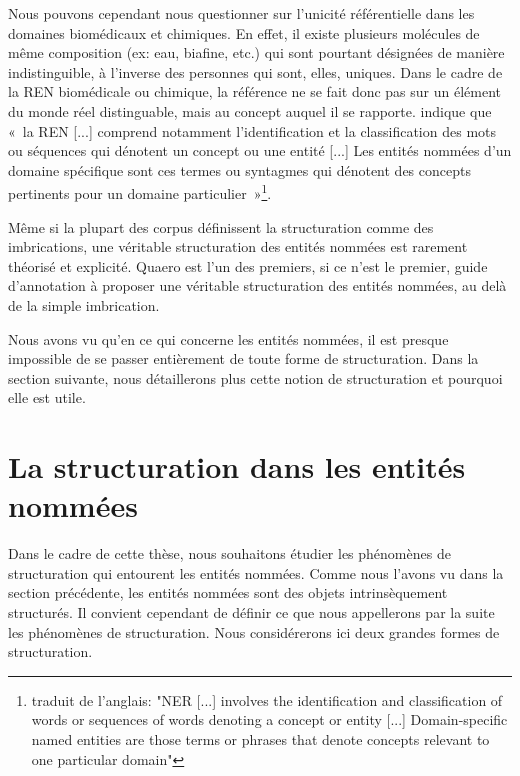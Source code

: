 \documentclass[12pt,a4paper,times,twoside,openright]{report}
\begin{document}
Nous pouvons cependant nous questionner sur l'unicité référentielle dans les domaines biomédicaux et chimiques. En effet, il existe plusieurs molécules de même composition (ex: eau, biafine, etc.) qui sont pourtant désignées de manière indistinguible, à l'inverse des personnes qui sont, elles, uniques. Dans le cadre de la REN biomédicale ou chimique, la référence ne se fait donc pas sur un élément du monde réel distinguable, mais au concept auquel il se rapporte. \citet{al2017biomedical} indique que «\ la REN [...] comprend notamment l'identification et la classification des mots ou séquences qui dénotent un concept ou une entité [...] Les entités nommées d'un domaine spécifique sont ces termes ou syntagmes qui dénotent des concepts pertinents pour un domaine particulier\ »\footnote{traduit de l'anglais: "NER [...] involves the identification and classification of words or sequences of words denoting a concept or entity [...] Domain-specific named entities are those terms or phrases that denote concepts relevant to one particular domain"}.

Même si la plupart des corpus définissent la structuration comme des imbrications, une véritable structuration des entités nommées est rarement théorisé et explicité. Quaero \citep{rosset2011entites} est l'un des premiers, si ce n'est le premier, guide d'annotation à proposer une véritable structuration des entités nommées, au delà de la simple imbrication.

Nous avons vu qu'en ce qui concerne les entités nommées, il est presque impossible de se passer entièrement de toute forme de structuration. Dans la section suivante, nous détaillerons plus cette notion de structuration et pourquoi elle est utile.



    \section{La structuration dans les entités nommées}
    \label{sec:intro-struct-in-NE}

Dans le cadre de cette thèse, nous souhaitons étudier les phénomènes de structuration qui entourent les entités nommées. Comme nous l'avons vu dans la section précédente, les entités nommées sont des objets intrinsèquement structurés. Il convient cependant de définir ce que nous appellerons par la suite les phénomènes de structuration. Nous considérerons ici deux grandes formes de structuration.
\end{document}
